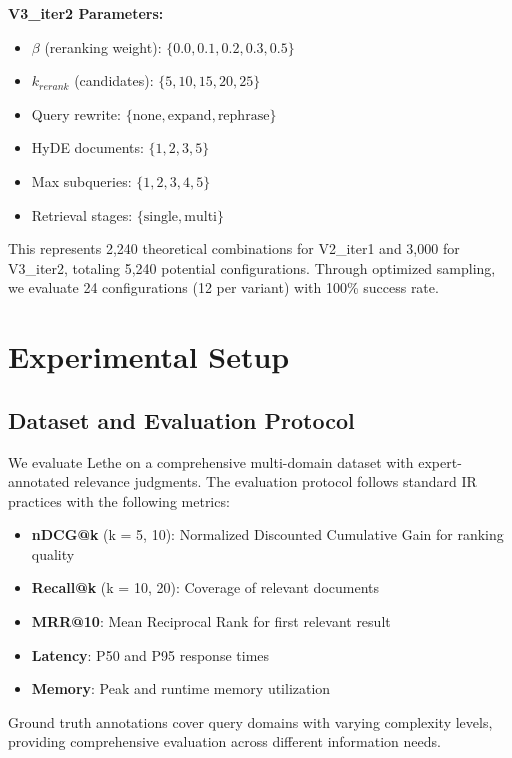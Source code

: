 \documentclass{neurips_2025}
\begin{document}
\textbf{V3\_iter2 Parameters:}
\begin{itemize}
\item $\beta$ (reranking weight): $\{0.0, 0.1, 0.2, 0.3, 0.5\}$
\item $k_{rerank}$ (candidates): $\{5, 10, 15, 20, 25\}$
\item Query rewrite: $\{\text{none}, \text{expand}, \text{rephrase}\}$
\item HyDE documents: $\{1, 2, 3, 5\}$
\item Max subqueries: $\{1, 2, 3, 4, 5\}$
\item Retrieval stages: $\{\text{single}, \text{multi}\}$
\end{itemize}

This represents 2,240 theoretical combinations for V2\_iter1 and 3,000 for V3\_iter2, totaling 5,240 potential configurations. Through optimized sampling, we evaluate 24 configurations (12 per variant) with 100\% success rate.

\section{Experimental Setup}

\subsection{Dataset and Evaluation Protocol}

We evaluate Lethe on a comprehensive multi-domain dataset with expert-annotated relevance judgments. The evaluation protocol follows standard IR practices with the following metrics:

\begin{itemize}
\item \textbf{nDCG@k} (k = 5, 10): Normalized Discounted Cumulative Gain for ranking quality
\item \textbf{Recall@k} (k = 10, 20): Coverage of relevant documents  
\item \textbf{MRR@10}: Mean Reciprocal Rank for first relevant result
\item \textbf{Latency}: P50 and P95 response times
\item \textbf{Memory}: Peak and runtime memory utilization
\end{itemize}

Ground truth annotations cover query domains with varying complexity levels, providing comprehensive evaluation across different information needs.
\end{document}
